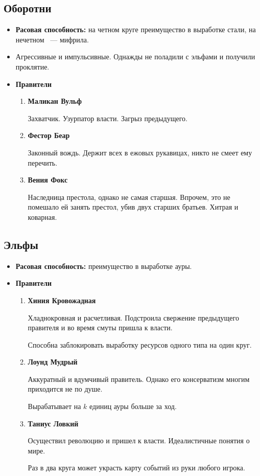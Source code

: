 \documentclass[a4paper,12pt,landscape]{article}
\begin{document}
    \subsection{Оборотни}
    \begin{itemize}
      \item \textbf{Расовая способность:} на четном круге преимущество в выработке стали, на нечетном ~--- мифрила.
      \item Агрессивные и импульсивные. Однажды не поладили с эльфами и получили проклятие.
      \item \textbf{Правители}
        \begin{enumerate}
          \item \textbf{Маликан Вульф}
          
          Захватчик. Узурпатор власти. Загрыз предыдущего.
          \item \textbf{Фестор Беар}
          
          Законный вождь. Держит всех в ежовых рукавицах, никто не смеет ему перечить.
          
          \item \textbf{Вения Фокс}
          
          Наследница престола, однако не самая старшая. Впрочем, это не помешало ей занять престол, убив двух старших братьев. Хитрая и коварная.       
           \end{enumerate}
    \end{itemize}
    
    \subsection{Эльфы}
    \begin{itemize}
      \item \textbf{Расовая способность:} преимущество в выработке ауры.
      \item \textbf{Правители} 
        \begin{enumerate}
          \item \textbf{Хиния Кровожадная}
          
          Хладнокровная и расчетливая. Подстроила свержение предыдущего правителя и во время смуты пришла к власти.

          Способна заблокировать выработку ресурсов одного типа на один круг.
          \item \textbf{Лоунд Мудрый}
          
          Аккуратный и вдумчивый правитель. Однако его консерватизм многим приходится не по душе.

          Вырабатывает на $k$ единиц ауры больше за ход.
          \item \textbf{Таниус Ловкий}
          
          Осуществил революцию и пришел к власти. Идеалистичные понятия о мире.

          Раз в два круга может украсть карту событий из руки любого игрока.
        \end{enumerate}
    \end{itemize}    
    
\end{document}
